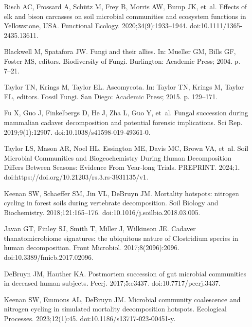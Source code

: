 \documentclass[
  10pt,
  letterpaper,
]{article}
\begin{document}
\begin{thebibliography}{10}
  Risch AC, Frossard A, Schütz M, Frey B, Morris AW, Bump JK, et~al.
  \newblock Effects of elk and bison carcasses on soil microbial communities and
    ecosystem functions in {Yellowstone}, {USA}.
  \newblock Functional Ecology. 2020;34(9):1933--1944.
  \newblock doi:{10.1111/1365-2435.13611}.
  
  Blackwell M, Spatafora JW.
  \newblock Fungi and their allies.
  \newblock In: Mueller GM, Bills GF, Foster MS, editors. Biodiversity of
    {Fungi}. Burlington: Academic Press; 2004. p. 7--21.
  
  Taylor TN, Krings M, Taylor EL.
  \newblock Ascomycota.
  \newblock In: Taylor TN, Krings M, Taylor EL, editors. Fossil {Fungi}. San
    Diego: Academic Press; 2015. p. 129--171.
  
  Fu X, Guo J, Finkelbergs D, He J, Zha L, Guo Y, et~al.
  \newblock Fungal succession during mammalian cadaver decomposition and
    potential forensic implications.
  \newblock Sci Rep. 2019;9(1):12907.
  \newblock doi:{10.1038/s41598-019-49361-0}.
  
  Taylor LS, Mason AR, Noel HL, Essington ME, Davis MC, Brown VA, et~al.
  \newblock Soil Microbial Communities and Biogeochemistry During Human
    Decomposition Differs Between Seasons: Evidence From Year-long Trials.
  \newblock PREPRINT. 2024;1.
  \newblock doi:{https://doi.org/10.21203/rs.3.rs-3931135/v1}.
  
  Keenan SW, Schaeffer SM, Jin VL, DeBruyn JM.
  \newblock Mortality hotspots: nitrogen cycling in forest soils during
    vertebrate decomposition.
  \newblock Soil Biology and Biochemistry. 2018;121:165--176.
  \newblock doi:{10.1016/j.soilbio.2018.03.005}.
  
  Javan GT, Finley SJ, Smith T, Miller J, Wilkinson JE.
  \newblock Cadaver thanatomicrobiome signatures: the ubiquitous nature of
    {Clostridium} species in human decomposition.
  \newblock Front Microbiol. 2017;8(2096):2096.
  \newblock doi:{10.3389/fmicb.2017.02096}.
  
  DeBruyn JM, Hauther KA.
  \newblock Postmortem succession of gut microbial communities in deceased human
    subjects.
  \newblock Peerj. 2017;5:e3437.
  \newblock doi:{10.7717/peerj.3437}.
  
  Keenan SW, Emmons AL, DeBruyn JM.
  \newblock Microbial community coalescence and nitrogen cycling in simulated
    mortality decomposition hotspots.
  \newblock Ecological Processes. 2023;12(1):45.
  \newblock doi:{10.1186/s13717-023-00451-y}.
  

\end{thebibliography}
\end{document}
